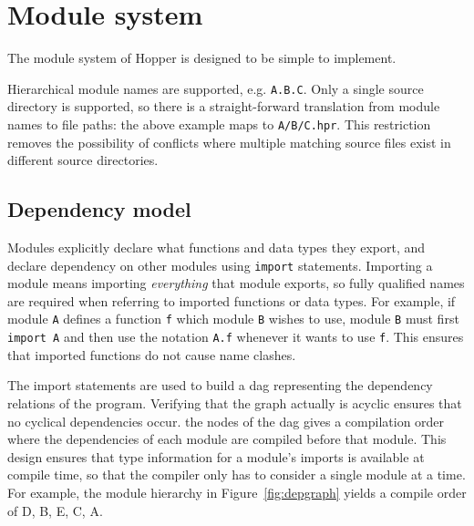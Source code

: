 \section{Module system}
\label{sec:dai_modules}


The module system of Hopper is designed to be simple to implement.

Hierarchical module names are supported, e.g. \texttt{A.B.C}. Only a single source directory is supported, so there is a straight-forward translation from module names to file paths: the above example maps to \texttt{A/B/C.hpr}. This restriction removes the possibility of conflicts where multiple matching source files exist in different source directories.

\subsection{Dependency model}
Modules explicitly declare what functions and data types they export, and declare dependency on other modules using \texttt{import} statements. Importing a module means importing \emph{everything} that module exports, so fully qualified names are required when referring to imported functions or data types. For example, if module \texttt{A} defines a function \texttt{f} which module \texttt{B} wishes to use, module \texttt{B} must first \texttt{import A} and then use the notation \texttt{A.f} whenever it wants to use \texttt{f}. This ensures that imported functions do not cause name clashes.

The import statements are used to build a \gls{dag} representing the dependency relations of the program. Verifying that the graph actually is acyclic ensures that no cyclical dependencies occur.  the nodes of the \gls{dag} gives a compilation order where the dependencies of each module are compiled before that module. This design ensures that type information for a module's imports is available at compile time, so that the compiler only has to consider a single module at a time. For example, the module hierarchy in Figure~\ref{fig:depgraph} yields a compile order of D, B, E, C, A.

